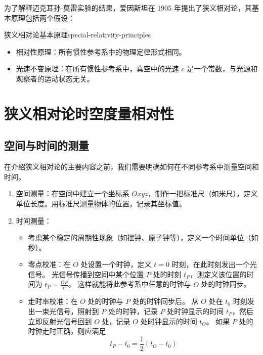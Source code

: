 为了解释迈克耳孙-莫雷实验的结果，爱因斯坦在 1905 年提出了狭义相对论，其基本原理包括两个假设：
\begin{principle}{狭义相对论基本原理}{special-relativity-principles}
    \begin{itemize}
        \item 相对性原理：所有惯性参考系中的物理定律形式相同。
        \item 光速不变原理：在所有惯性参考系中，真空中的光速 $ c $ 是一个常数，与光源和观察者的运动状态无关。
    \end{itemize}

\end{principle}

\section{狭义相对论时空度量相对性}

\subsection{空间与时间的测量}

在介绍狭义相对论的主要内容之前，我们需要明确如何在不同参考系中测量空间和时间。
\begin{enumerate}
    \item 空间测量：在空间中建立一个坐标系 $Oxyz$，制作一把标准尺（如米尺），定义单位长度。用标准尺测量物体的位置，记录其坐标值。
    \item 时间测量：
          \begin{itemize}
              \item 考虑某个稳定的周期性现象（如摆钟、原子钟等），定义一个时间单位（如秒）。
              \item 零点校准：在 $O$ 处设置一个时钟，定义 $t=0$ 时刻，在此时刻发出一个光信号。
                    光信号传播到空间中某个位置 $P$ 处的时刻 $t_P$，则定义该位置的时间为 $t_P = \frac{\overline{OP}}{c}$。
                    这样就能将此参考系中任意的时钟与 $O$ 处的时钟同步。
              \item 走时率校准：在 $O$ 处的时钟与 $P$ 处的时钟同步后。
                    从 $O$ 处在 $t_0$ 时刻发出一束光信号，照射到 $P$ 处的时钟，记录 $P$ 处时钟显示的时间 $t_P$，然后立即反射光信号回到 $O$ 处，记录 $O$ 处时钟显示的时间 $t_O$。
                    如果 $P$ 处的时钟走时正确，则应满足
                    \begin{equation}
                        t_P - t_0 = \frac{1}{2} (t_O - t_0)
                    \end{equation}
          \end{itemize}
\end{enumerate}

